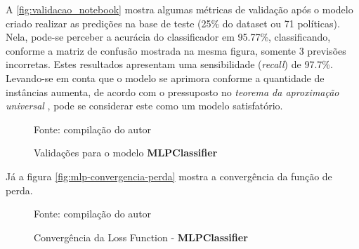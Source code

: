 A \autoref{fig:validacao_notebook} mostra algumas métricas de validação após o modelo criado realizar as predições na base de teste (25\% do dataset ou 71 políticas). Nela, pode-se perceber a acurácia do classificador em 95.77\%, classificando, conforme a matriz de confusão mostrada na mesma figura, somente 3 previsões incorretas. Estes resultados apresentam uma sensibilidade (\textit{recall}) de 97.7\%. Levando-se em conta que o modelo se aprimora conforme a quantidade de instâncias aumenta, de acordo com o pressuposto no\textit{ teorema da aproximação universal} , pode se considerar este como um modelo satisfatório.

\begin{figure}[h]
	\centering
	\caption{Validações para o modelo \textbf{MLPClassifier}}
	
	\label{fig:validacao_notebook}
	{\scriptsize Fonte: compilação do autor}
\end{figure}


Já a figura \autoref{fig:mlp-convergencia-perda} mostra a convergência da função de perda.

\begin{figure}[h]
	\centering
	\caption{Convergência da Loss Function - \textbf{MLPClassifier}}
	
	\label{fig:mlp-convergencia-perda}
	{\scriptsize Fonte: compilação do autor}
\end{figure}


